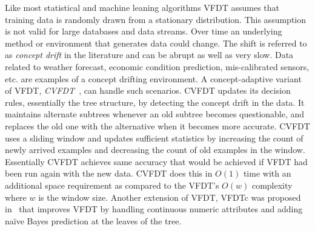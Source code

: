 Like most statistical and machine leaning algorithms VFDT assumes that training data is randomly drawn from a stationary distribution. This assumption is not valid for large databases and data streams. Over time an underlying method or environment that generates data could change. The shift is  referred to as {\it concept drift} in the literature and can be abrupt as well as very slow. Data related to weather forecast, economic condition prediction, mis-calibrated sensors, etc. are examples of a concept drifting environment. A concept-adaptive variant of VFDT, \textit{CVFDT}~\cite{hulten01:cvfdt}, can handle such scenarios. CVFDT updates its decision rules, essentially the tree structure, by detecting the concept drift in the data. It maintains alternate subtrees whenever an old subtree becomes questionable, and replaces the old one with the alternative when it becomes more accurate. CVFDT uses a sliding window and updates sufficient statistics by increasing the count of newly arrived examples and decreasing the count of old examples in the window. Essentially CVFDT achieves same accuracy that would be achieved if VFDT had been run again with the new data. CVFDT does this in $O(1)$ time with an additional space requirement as compared to the VFDT's $O(w)$ complexity where $w$ is the window size. Another extension of VFDT, VFDTc was proposed in~\cite{gama05:vfdtc} that improves VFDT by handling continuous numeric attributes and adding na\"ive Bayes prediction at the leaves of the tree.



